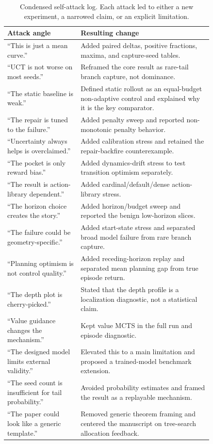 \documentclass{article}
\begin{document}
\begin{table}[htbp]
\caption{Condensed self-attack log. Each attack led to either a new experiment, a narrowed claim, or an explicit limitation.}
\label{tab:self-attack-log}
\begin{center}
\small
\begin{tabular}{p{0.30\linewidth}p{0.54\linewidth}}
\toprule
Attack angle & Resulting change \\
\midrule
``This is just a mean curve.'' & Added paired deltas, positive fractions, maxima, and capture-seed tables. \\
``UCT is not worse on most seeds.'' & Reframed the core result as rare-tail branch capture, not dominance. \\
``The static baseline is weak.'' & Defined static rollout as an equal-budget non-adaptive control and explained why it is the key comparator. \\
``The repair is tuned to the failure.'' & Added penalty sweep and reported non-monotonic penalty behavior. \\
``Uncertainty always helps is overclaimed.'' & Added calibration stress and retained the repair-backfire counterexample. \\
``The pocket is only reward bias.'' & Added dynamics-drift stress to test transition optimism separately. \\
``The result is action-library dependent.'' & Added cardinal/default/dense action-library stress. \\
``The horizon choice creates the story.'' & Added horizon/budget sweep and reported the benign low-horizon slices. \\
``The failure could be geometry-specific.'' & Added start-state stress and separated broad model failure from rare branch capture. \\
``Planning optimism is not control quality.'' & Added receding-horizon replay and separated mean planning gap from true episode return. \\
``The depth plot is cherry-picked.'' & Stated that the depth profile is a localization diagnostic, not a statistical claim. \\
``Value guidance changes the mechanism.'' & Kept value MCTS in the full run and episode diagnostic. \\
``The designed model limits external validity.'' & Elevated this to a main limitation and proposed a trained-model benchmark extension. \\
``The seed count is insufficient for tail probability.'' & Avoided probability estimates and framed the result as a replayable mechanism. \\
``The paper could look like a generic template.'' & Removed generic theorem framing and centered the manuscript on tree-search allocation feedback. \\
\bottomrule
\end{tabular}
\end{center}
\end{table}
\end{document}
